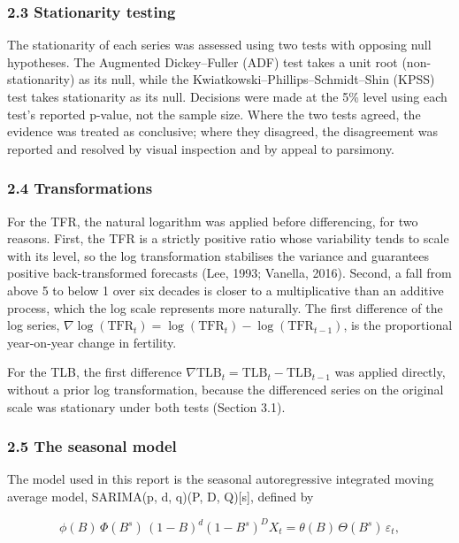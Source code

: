 \documentclass[
  11pt,
]{article}
\begin{document}
\subsubsection{2.3 Stationarity testing}\label{stationarity-testing}

The stationarity of each series was assessed using two tests with
opposing null hypotheses. The Augmented Dickey--Fuller (ADF) test takes
a unit root (non-stationarity) as its null, while the
Kwiatkowski--Phillips--Schmidt--Shin (KPSS) test takes stationarity as
its null. Decisions were made at the 5\% level using each test's
reported p-value, not the sample size. Where the two tests agreed, the
evidence was treated as conclusive; where they disagreed, the
disagreement was reported and resolved by visual inspection and by
appeal to parsimony.

\subsubsection{2.4 Transformations}\label{transformations}

For the TFR, the natural logarithm was applied before differencing, for
two reasons. First, the TFR is a strictly positive ratio whose
variability tends to scale with its level, so the log transformation
stabilises the variance and guarantees positive back-transformed
forecasts (Lee, 1993; Vanella, 2016). Second, a fall from above 5 to
below 1 over six decades is closer to a multiplicative than an additive
process, which the log scale represents more naturally. The first
difference of the log series,
\(\nabla \log(\text{TFR}_t) = \log(\text{TFR}_t) - \log(\text{TFR}_{t-1})\),
is the proportional year-on-year change in fertility.

For the TLB, the first difference
\(\nabla \text{TLB}_t = \text{TLB}_t - \text{TLB}_{t-1}\) was applied
directly, without a prior log transformation, because the differenced
series on the original scale was stationary under both tests (Section
3.1).

\subsubsection{2.5 The seasonal model}\label{the-seasonal-model}

The model used in this report is the seasonal autoregressive integrated
moving average model, SARIMA(p, d, q)(P, D, Q){[}s{]}, defined by

\[
\phi(B)\,\Phi(B^s)\,(1-B)^d (1-B^s)^D X_t = \theta(B)\,\Theta(B^s)\,\varepsilon_t,
\]
\end{document}
